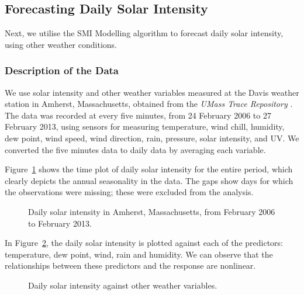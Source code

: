 \documentclass[
  11pt,
  a4paper,
]{article}
\begin{document}
\subsection{Forecasting Daily Solar Intensity}\label{sec-solar}

Next, we utilise the SMI Modelling algorithm to forecast daily solar
intensity, using other weather conditions.

\subsubsection{Description of the Data}\label{description-of-the-data-1}

We use solar intensity and other weather variables measured at the Davis
weather station in Amherst, Massachusetts, obtained from the \emph{UMass
Trace Repository} \autocite{Umass2023}. The data was recorded at every
five minutes, from 24 February 2006 to 27 February 2013, using sensors
for measuring temperature, wind chill, humidity, dew point, wind speed,
wind direction, rain, pressure, solar intensity, and UV. We converted
the five minutes data to daily data by averaging each variable.

Figure~\ref{fig-solar} shows the time plot of daily solar intensity for
the entire period, which clearly depicts the annual seasonality in the
data. The gaps show days for which the observations were missing; these
were excluded from the analysis.

\begin{figure}


\caption{\label{fig-solar}Daily solar intensity in Amherst,
Massachusetts, from February 2006 to February 2013.}

\end{figure}%

In Figure~\ref{fig-preds}, the daily solar intensity is plotted against
each of the predictors: temperature, dew point, wind, rain and humidity.
We can observe that the relationships between these predictors and the
response are nonlinear.

\begin{figure}


\caption{\label{fig-preds}Daily solar intensity against other weather
variables.}

\end{figure}%
\end{document}
